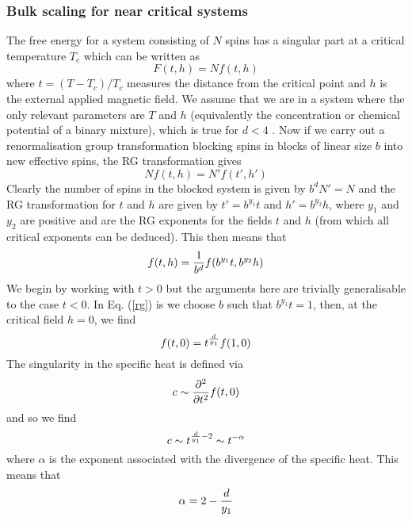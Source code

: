     \subsubsection{Bulk scaling for near critical systems}
The free energy for a system consisting of $N$  spins has a singular part at a critical temperature $T_c$ which can be written as
\begin{equation}
    F(t,h) = N f(t,h)
\end{equation}
where $t = (T-T_c)/ T_c$ measures the distance from the critical point and $h$ is the external applied magnetic field. We assume that we are in a system where the only relevant parameters are $T$ and $h$ (equivalently the concentration or chemical potential of a binary mixture), which is true for $d\less 4$ \cite{amit_field_2005}.
Now if we carry out a renormalisation group transformation
blocking spins in blocks of linear size $b$ into new effective spins, the RG transformation
gives
\begin{equation}
    N f(t,h) = N'f(t',h')
\end{equation}
Clearly the number of spins in the blocked system is given by $b^d N'=N$ and the RG transformation for $t$ and $h$ are given by $t' = b^{y_1} t$ and $h' = b^{y_2}h$, where $y_1$ and $y_2$ are positive and are the RG exponents for the fields $t$ and $h$ (from which all critical exponents can be deduced). This then means that
\begin{equation}
    f(t,h) = {1\over b^d}f(b^{y_1} t,  b^{y_2} h) 
    \label{rg}
\end{equation}
We begin by working  with $t\greater 0$ but the arguments here are trivially generalisable to the case $t\less 0$. In Eq. (\ref{rg}) is we choose $b$ such that $b^{y_1}t=1$, then, at the critical field $h=0$, we find
\begin{equation}
    f(t,0) = t^{d\over y_1} f(1,0)
\end{equation}
The singularity in the specific heat is defined via
\begin{equation}
    c\sim {\partial^2 \over \partial t^2}f(t,0)
\end{equation}
and so we find
\begin{equation}
    c\sim t^{{d\over y_1}-2} \sim t^{-\alpha}
\end{equation}
where $\alpha$ is the exponent associated with the divergence of the specific heat. This means that
\begin{equation}
    \alpha = 2 -{d\over y_1}
\end{equation}
